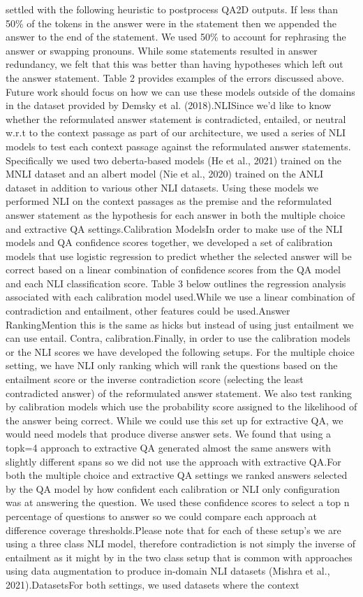 \documentclass{scrbook}
\begin{document}
settled with the following heuristic to postprocess QA2D outputs. If less than 50\% of the tokens in the answer were in the statement then we appended the answer to the end of the statement. We used 50\% to account for rephrasing the answer or swapping pronouns. While some statements resulted in answer redundancy, we felt that this was better than having hypotheses which left out the answer statement. Table 2 provides examples of the errors discussed above. Future work should focus on how we can use these models outside of the domains in the dataset provided by Demsky et al. (2018).NLISince we’d like to know whether the reformulated answer statement is contradicted, entailed, or neutral w.r.t to the context passage as part of our architecture, we used a series of NLI models to test each context passage against the reformulated answer statements. Specifically we used two deberta-based models (He et al., 2021) trained on the MNLI dataset and an albert model (Nie et al., 2020) trained on the ANLI dataset in addition to various other NLI datasets. Using these models we performed NLI on the context passages as the premise and the reformulated answer statement as the hypothesis for each answer in both the multiple choice and extractive QA settings.Calibration ModelsIn order to make use of the NLI models and QA confidence scores together, we developed a set of calibration models that use logistic regression to predict whether the selected answer will be correct based on a linear combination of confidence scores from the QA model and each NLI classification score. Table 3 below outlines the regression analysis associated with each calibration model used.While we use a linear combination of contradiction and entailment, other features could be used.Answer RankingMention this is the same as hicks but instead of using just entailment we can use entail. Contra, calibration.Finally, in order to use the calibration models or the NLI scores we have developed the following setups. For the multiple choice setting, we have NLI only ranking which will rank the questions based on the entailment score or the inverse contradiction score (selecting the least contradicted answer) of the reformulated answer statement. We also test ranking by calibration models which use the probability score assigned to the likelihood of the answer being correct. While we could use this set up for extractive QA, we would need models that produce diverse answer sets. We found that using a topk=4 approach to extractive QA generated almost the same answers with slightly different spans so we did not use the approach with extractive QA.For both the multiple choice and extractive QA settings we ranked answers selected by the QA model by how confident each calibration or NLI only configuration was at answering the question. We used these confidence scores to select a top n percentage of questions to answer so we could compare each approach at difference coverage thresholds.Please note that for each of these setup’s we are using a three class NLI model, therefore contradiction is not simply the inverse of entailment as it might by in the two class setup that is common with approaches using data augmentation to produce in-domain NLI datasets (Mishra et al., 2021).DatasetsFor both settings, we used datasets where the context 
\end{document}
